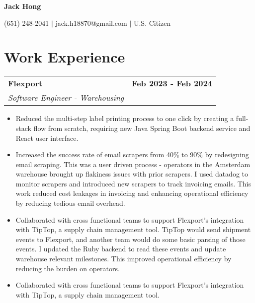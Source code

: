\documentclass[10pt]{extreport}
\makeatletter
\newcommand{\resumeSubheading}[4]{
  \vspace{-1pt}
    \begin{tabular*}{1.0\textwidth}{l@{\extracolsep{\fill}}r}
      \textbf{#1} & \textbf{#2}  \vspace{1mm} \\
      {#3} & \textbf{#4} \\
    \end{tabular*}\vspace{-3pt}
}
\makeatother
\begin{document}
\vspace*{-40pt}
\begin{center}
	\textbf{{\LARGE Jack Hong}} \\
	      \vspace{2mm}

    (651) 248-2041 $|$ jack.h18870@gmail.com $|$ U.S. Citizen
\end{center}
\vspace{-4mm}

\section{Work Experience}
\resumeSubheading{Flexport}{Feb 2023 - Feb 2024}
    {\textit{Software Engineer - Warehousing}}{}
    \vspace{-2mm}
    \begin{itemize}
    \item[\textperiodcentered] Reduced the multi-step label printing process to one click by creating a full-stack flow from scratch, requiring new Java Spring Boot backend service and React user interface.
        \vspace{-2mm}

    \item[\textperiodcentered] Increased the success rate of email scrapers from 40\% to 90\% by redesigning email scraping. This was a user driven process - operators in the Amsterdam warehouse brought up flakiness issues with prior scrapers. I used datadog to monitor scrapers and introduced new scrapers to track invoicing emails. This work reduced cost leakages in invoicing and enhancing operational efficiency by reducing tedious email overhead.
            \vspace{-2mm}

   \item[\textperiodcentered] Collaborated with cross functional teams to support Flexport’s integration with TipTop, a supply chain management tool. TipTop would send shipment events to Flexport, and another team would do some basic parsing of those events. I updated the Ruby backend to read these events and update warehouse relevant milestones. This improved operational efficiency by reducing the burden on operators.
           \vspace{-2mm}

   \item[\textperiodcentered] Collaborated with cross functional teams to support Flexport's integration with TipTop, a supply chain management tool. 
    \end{itemize}
\end{document}
